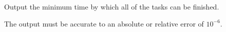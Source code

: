 

Output the minimum time by which all of the tasks can be finished.

The output must be accurate to an absolute or relative error of $10^{-6}$.
